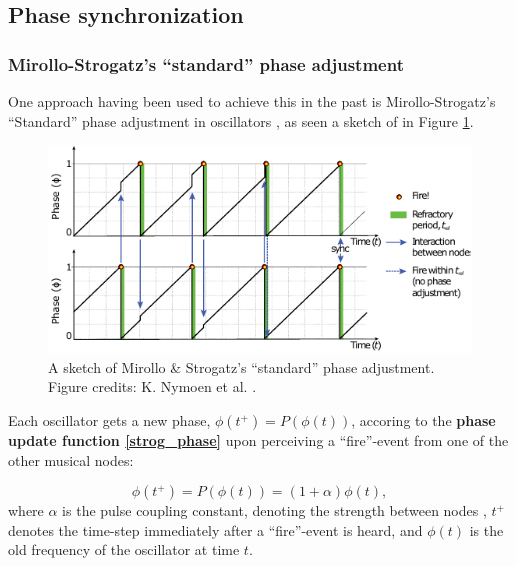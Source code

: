	
	\subsection{Phase synchronization}
	
		\subsubsection{Mirollo-Strogatz's ``standard'' phase adjustment} %
		\label{mirollo_strogatz_phase_adjust}
		
		
		One approach having been used to achieve this in the past is Mirollo-Strogatz's ``Standard'' phase adjustment in oscillators \cite{mirollo_strogatz_PCO_synch}, as seen a sketch of in Figure \ref{fig:mirollo_strogatz_phase_adj_sketch}.
		
		\begin{figure}[ht!]
			\centering
			\includegraphics[width=\linewidth]{Assets/DocSegments/Chapters/Background/Figures/Illustrations/MirolloStrogatzPhaseSync.pdf}
			\caption[Sketch of Mirollo \& Strogatz's ``standard'' phase adjustment.]{A sketch of Mirollo \& Strogatz's ``standard'' phase adjustment. Figure credits: K. Nymoen et al. \cite{nymoen_synch}.}
			\label{fig:mirollo_strogatz_phase_adj_sketch}
		\end{figure}
		
		Each oscillator gets a new phase, $\phi(t^+) = P(\phi(t))$, accoring to the \textbf{phase update function \eqref{strog_phase}} upon perceiving a ``fire''-event from one of the other musical nodes:
		
		\begin{equation}
		\label{strog_phase}
			\phi(t^+) = P(\phi(t)) = (1 + \alpha)\phi(t) ,
		\end{equation} \nl
		where $\alpha$ is the pulse coupling constant, denoting the strength between nodes \cite{nymoen_synch}, $t^+$ denotes the time-step immediately after a ``fire''-event is heard, and $\phi(t)$ is the old frequency of the oscillator at time $t$. 
		
